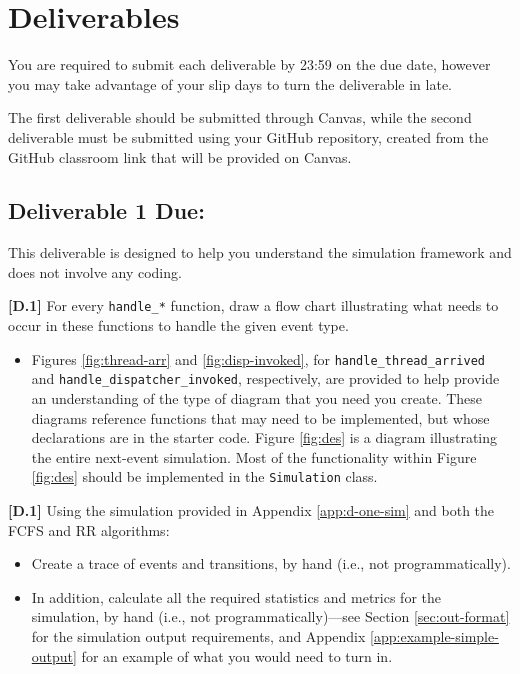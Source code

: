 \documentclass[main.tex]{subfiles}
\begin{document}
\section{Deliverables}
\label{sec:deliverables}
You are required to submit each deliverable by 23:59 on the due date, however you may take advantage of your slip days to turn the deliverable in late.

The first deliverable should be submitted through Canvas, while the second deliverable must be submitted using your GitHub repository, created from the GitHub classroom link that will be provided on Canvas.

\subsection{Deliverable 1 Due: \donedate}
This deliverable is designed to help you understand the simulation framework and does not involve any coding. 

\textbf{[D.1]} For every \texttt{handle\_*} function, draw a flow chart illustrating what needs to occur in these functions to handle the given event type. 
\begin{itemize}
    \item Figures \ref{fig:thread-arr} and \ref{fig:disp-invoked}, for \texttt{handle\_thread\_arrived} and \texttt{handle\_dispatcher\_invoked}, respectively, are provided to help provide an understanding of the type of diagram that you need you create. These diagrams reference functions that may need to be implemented, but whose declarations are in the starter code. Figure \ref{fig:des} is a diagram illustrating the entire next-event simulation. Most of the functionality within Figure \ref{fig:des} should be implemented in the \texttt{Simulation} class.
\end{itemize}



\textbf{[D.1]} Using the simulation provided in Appendix \ref{app:d-one-sim} and both the FCFS and RR algorithms: 
\begin{itemize}
    \item Create a trace of events and transitions, by hand (i.e., not programmatically). 
    \item In addition, calculate all the required statistics and metrics for the simulation, by hand (i.e., not programmatically)---see Section \ref{sec:out-format} for the simulation output requirements, and Appendix \ref{app:example-simple-output} for an example of what you would need to turn in.
\end{itemize}
\end{document}
